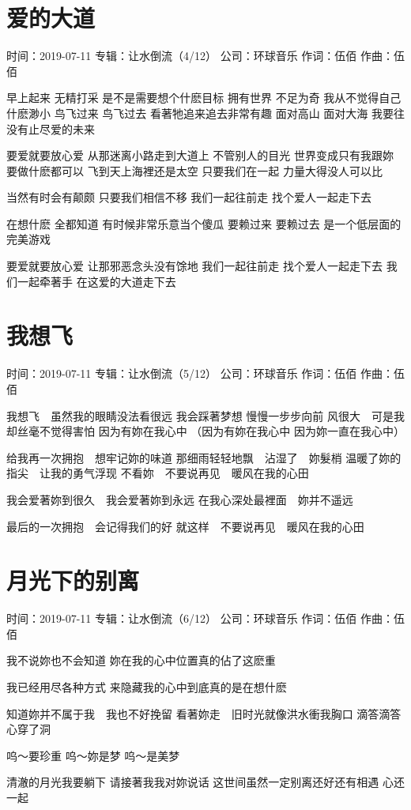 \documentclass[UTF8,a4paper,oneside,twocolumn,12pt]{ctexbook}
\newcommand{\infopair}[2]{\textbullet #1：#2}
\newcommand{\zc}[1][伍佰]{\infopair{作词}{#1}}
\newcommand{\zq}[1][伍佰]{\infopair{作曲}{#1}}
\newcommand{\zj}[1]{\infopair{专辑}{#1}}
\newcommand{\sj}[1]{\infopair{时间}{#1}}
\newcommand{\gs}[1]{\infopair{公司}{#1}}
\newenvironment{info}{\begin{flushleft}\kaishu
	}
	{\end{flushleft}\normalsize\yahei\par}
\newenvironment{lyric}{
	}
{}
\begin{document}
\section{爱的大道}
\begin{info}
	\sj{2019-07-11}
	\zj{让水倒流（4/12）}
	\gs{环球音乐}
	\zc
	\zq
\end{info}
\begin{lyric}
	早上起来 无精打采
	是不是需要想个什麽目标
	拥有世界 不足为奇
	我从不觉得自己什麽渺小
	鸟飞过来 鸟飞过去
	看著牠追来追去非常有趣
	面对高山 面对大海
	我要往没有止尽爱的未来

	要爱就要放心爱
	从那迷离小路走到大道上
	不管别人的目光
	世界变成只有我跟妳
	要做什麽都可以
	飞到天上海裡还是太空
	只要我们在一起
	力量大得没人可以比

	当然有时会有颠颇
	只要我们相信不移
	我们一起往前走
	找个爱人一起走下去

	在想什麽 全都知道
	有时候非常乐意当个傻瓜
	要赖过来 要赖过去
	是一个低层面的完美游戏

	要爱就要放心爱
	让那邪恶念头没有馀地
	我们一起往前走
	找个爱人一起走下去
	我们一起牵著手
	在这爱的大道走下去
\end{lyric}

\section{我想飞}
\begin{info}
	\sj{2019-07-11}
	\zj{让水倒流（5/12）}
	\gs{环球音乐}
	\zc
	\zq
\end{info}
\begin{lyric}
	我想飞　虽然我的眼睛没法看很远
	我会踩著梦想
	慢慢一步步向前
	风很大　可是我却丝毫不觉得害怕
	因为有妳在我心中
	（因为有妳在我心中 因为妳一直在我心中）

	给我再一次拥抱　想牢记妳的味道
	那细雨轻轻地飘　沾湿了　妳髮梢
	温暖了妳的指尖　让我的勇气浮现
	不看妳　不要说再见　暖风在我的心田

	我会爱著妳到很久　我会爱著妳到永远
	在我心深处最裡面　妳并不遥远

	最后的一次拥抱　会记得我们的好
	就这样　不要说再见　暖风在我的心田
\end{lyric}

\section{月光下的别离}
\begin{info}
	\sj{2019-07-11}
	\zj{让水倒流（6/12）}
	\gs{环球音乐}
	\zc
	\zq
\end{info}
\begin{lyric}
	我不说妳也不会知道
	妳在我的心中位置真的佔了这麽重

	我已经用尽各种方式
	来隐藏我的心中到底真的是在想什麽

	知道妳并不属于我　我也不好挽留
	看著妳走　旧时光就像洪水衝我胸口
	滴答滴答心穿了洞

	呜～要珍重
	呜～妳是梦
	呜～是美梦

	清澈的月光我要躺下
	请接著我我对妳说话
	这世间虽然一定别离还好还有相遇
	心还一起
\end{lyric}
\end{document}
